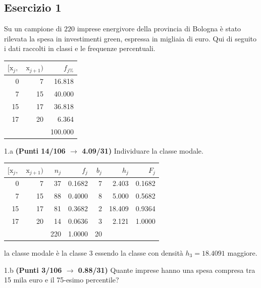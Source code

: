 \documentclass[
  11pt,
]{book}
\theoremstyle{mytheoremstyle}
\theoremstyle{mydefstyle}
\newenvironment{sol}
  {
  \begin{tcolorbox}[enhanced,breakable,arc=0.1mm,boxrule=1pt,colback=white,colframe=iblue,
  title=\bf \fontfamily{lmss}\selectfont \hspace{.5 cm} Soluzione,drop fuzzy shadow]

}{
\end{tcolorbox}
  }
\begin{document}
\subsection{Esercizio 1}\label{esercizio-1-13}

Su un campione di \(220\) imprese energivore della provincia di Bologna è stato
rilevata la spesa in investimenti green, espressa in migliaia di euro. Qui di seguito i dati raccolti in classi
e le frequenze percentuali.

\begin{table}[H]
\centering
\begin{tabular}{rrr}
\toprule
$[\text{x}_j,$ & $\text{x}_{j+1})$ & $f_{j\%}$\\
\midrule
0 & 7 & 16.818\\
7 & 15 & 40.000\\
15 & 17 & 36.818\\
17 & 20 & 6.364\\
 &  & 100.000\\
\bottomrule
\end{tabular}
\end{table}

1.a \textbf{(Punti 14/106 \(\rightarrow\) 4.09/31)} Individuare la classe modale.

\begin{sol}

\begin{table}[H]
\centering
\begin{tabular}{rrrrrrr}
\toprule
$[\text{x}_j,$ & $\text{x}_{j+1})$ & $n_j$ & $f_j$ & $b_j$ & $h_j$ & $F_j$\\
\midrule
0 & 7 & 37 & 0.1682 & 7 & 2.403 & 0.1682\\
7 & 15 & 88 & 0.4000 & 8 & 5.000 & 0.5682\\
15 & 17 & 81 & 0.3682 & 2 & 18.409 & 0.9364\\
17 & 20 & 14 & 0.0636 & 3 & 2.121 & 1.0000\\
 &  & 220 & 1.0000 & 20 &  & \\
\bottomrule
\end{tabular}
\end{table}

la classe modale è la classe \(3\) essendo la classe con densità \(h_{3}=18.4091\) maggiore.

\end{sol}

1.b \textbf{(Punti 3/106 \(\rightarrow\) 0.88/31)} Quante imprese hanno una spesa compresa tra 15 mila euro e il 75-esimo percentile?
\end{document}
